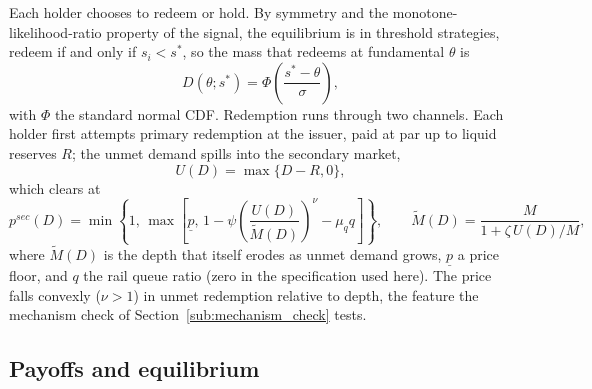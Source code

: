 Each holder chooses to redeem or hold. By symmetry and the monotone-likelihood-ratio property of the signal, the equilibrium is in threshold strategies, redeem if and only if $s_i < s^*$, so the mass that redeems at fundamental $\theta$ is
\begin{equation}\label{eq:D}
D(\theta; s^*) = \Phi\!\left(\frac{s^* - \theta}{\sigma}\right),
\end{equation}
with $\Phi$ the standard normal CDF. Redemption runs through two channels. Each holder first attempts primary redemption at the issuer, paid at par up to liquid reserves $R$; the unmet demand spills into the secondary market,
\begin{equation}\label{eq:U}
U(D) = \max\{D-R, 0\},
\end{equation}
which clears at
\begin{equation}\label{eq:psec}
p^{sec}(D) = \min\!\left\{1, \, \max\!\left[\underline{p}, \, 1 - \psi\!\left(\frac{U(D)}{\widetilde M(D)}\right)^\nu - \mu_q q\right]\right\}, \qquad
\widetilde M(D) = \frac{M}{1 + \zeta\, U(D)/M},
\end{equation}
where $\widetilde M(D)$ is the depth that itself erodes as unmet demand grows, $\underline p$ a price floor, and $q$ the rail queue ratio (zero in the specification used here). The price falls convexly ($\nu>1$) in unmet redemption relative to depth, the feature the mechanism check of Section~\ref{sub:mechanism_check} tests.

\subsection{Payoffs and equilibrium}\label{sub:model_equilibrium}


